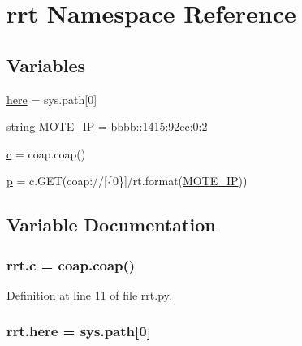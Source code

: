 \hypertarget{namespacerrt}{}\section{rrt Namespace Reference}
\label{namespacerrt}
\subsection*{Variables}
\begin{DoxyCompactItemize}
\item 
\hyperlink{namespacerrt_a6fc91a685ad5871cfa8babe51cc26233}{here} = sys.\+path\mbox{[}0\mbox{]}
\item 
string \hyperlink{namespacerrt_a102ccddafd78c2e5a9a7bd61e59c662b}{M\+O\+T\+E\+\_\+\+IP} = \textquotesingle{}bbbb\+::1415\+:92cc\+:0\+:2\textquotesingle{}
\item 
\hyperlink{namespacerrt_a355c43e4cf0a540c6e9f712d3f1248c0}{c} = coap.\+coap()
\item 
\hyperlink{namespacerrt_aea6bdc9d2a9d99a8c839b237ec0e344a}{p} = c.\+G\+ET(\textquotesingle{}coap\+://\mbox{[}\{0\}\mbox{]}/rt\textquotesingle{}.format(\hyperlink{namespacerrt_a102ccddafd78c2e5a9a7bd61e59c662b}{M\+O\+T\+E\+\_\+\+IP}))
\end{DoxyCompactItemize}


\subsection{Variable Documentation}
\subsubsection[{\texorpdfstring{c}{c}}]{\setlength{\rightskip}{0pt plus 5cm}rrt.\+c = coap.\+coap()}\hypertarget{namespacerrt_a355c43e4cf0a540c6e9f712d3f1248c0}{}\label{namespacerrt_a355c43e4cf0a540c6e9f712d3f1248c0}


Definition at line 11 of file rrt.\+py.

\subsubsection[{\texorpdfstring{here}{here}}]{\setlength{\rightskip}{0pt plus 5cm}rrt.\+here = sys.\+path\mbox{[}0\mbox{]}}\hypertarget{namespacerrt_a6fc91a685ad5871cfa8babe51cc26233}{}\label{namespacerrt_a6fc91a685ad5871cfa8babe51cc26233}



